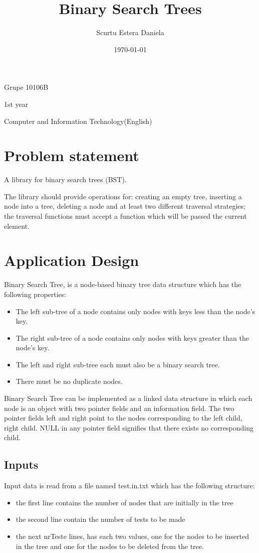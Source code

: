 \documentclass{article}
\title{Binary Search Trees}
\author{Scurtu Estera Daniela }
\date{\today}
\begin{document}
\maketitle
Grupe 10106B

1st year

Computer and Information Technology(English) 
\pagebreak
\section{Problem statement}

A library for binary search trees (BST). 

The library should provide operations for: creating an empty tree, inserting a node into a tree, deleting a node and at least two different traversal strategies; the traversal functions must accept a function which will be passed the current element.

\section{Application Design}
Binary Search Tree, is a node-based binary tree data structure which has the following properties:
\begin{itemize}
\item The left sub-tree of a node contains only nodes with keys less than the node’s key.
\item The right sub-tree of a node contains only nodes with keys greater than the node’s key.
\item The left and right sub-tree each must also be a binary search tree.
\item There must be no duplicate nodes.
\end{itemize}

Binary Search Tree can be implemented as a linked data structure in which each node is an object with two pointer fields and an information field. The two pointer fields left and right point to the nodes corresponding to the left child, right child. NULL in any pointer field signifies that there exists no corresponding child. 

\subsection{Inputs}

Input data is read from a file named test.in.txt which has the following structure: 
\begin{itemize}
    \item the first line contains the number of nodes that are initially in the tree
    \item the second line contain the number of tests to be made
    \item the next nrTeste lines, has each two values, one for the nodes to be inserted in the tree and one for the nodes to be deleted from the tree.
\end{itemize}
\end{document}
